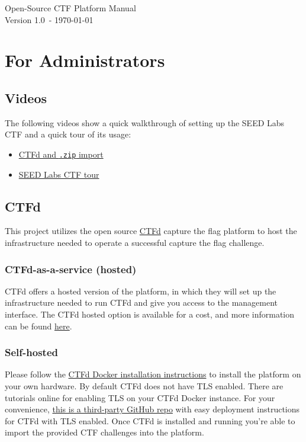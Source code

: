 \documentclass[11pt]{article}
\newcommand{\manualVersion}{1.0}
\begin{document}
\begin{center}
	{\Huge Open-Source CTF Platform Manual} \\
	{\small Version \manualVersion\ - \today}
\end{center}

\section{For Administrators}

\subsection{Videos}

The following videos show a quick walkthrough of setting up the SEED Labs CTF and a quick tour of its usage:

\begin{itemize}
	\item \href{run:./videos/SEED_CTF_setup_part1.mp4}{CTFd and \texttt{.zip} import}
	\item \href{run:./videos/SEED_CTF_setup_part2.mp4}{SEED Labs CTF tour}
\end{itemize}

\subsection{CTFd}

This project utilizes the open source \href{https://ctfd.io/}{CTFd} capture the flag platform to host the infrastructure needed to operate a successful capture the flag challenge.

\subsubsection{CTFd-as-a-service (hosted)}

CTFd offers a hosted version of the platform, in which they will set up the infrastructure needed to run CTFd and give you access to the management interface.
The CTFd hosted option is available for a cost, and more information can be found \href{https://ctfd.io/pricing/}{here}.

\subsubsection{Self-hosted}

Please follow the \href{https://docs.ctfd.io/docs/deployment/installation#docker}{CTFd Docker installation instructions} to install the platform on your own hardware.
By default CTFd does not have TLS enabled.
There are tutorials online for enabling TLS on your CTFd Docker instance.
For your convenience, \href{https://github.com/tghosth/CTFd-docker-deploy}{this is a third-party GitHub repo} with easy deployment instructions for CTFd with TLS enabled.
Once CTFd is installed and running you're able to import the provided CTF challenges into the platform.
\end{document}
